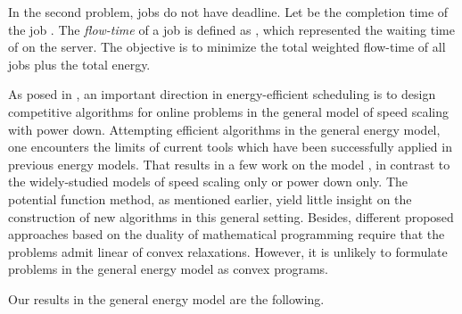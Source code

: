 \documentclass[11pt]{article}
\begin{document}
In the second problem, jobs do not have deadline. Let  
be the completion time of the job . 
The \emph{flow-time} of a job  is defined as , 
which represented the waiting time of  on the server.
The objective is to minimize the total weighted flow-time of all jobs plus the total 
energy. 

As posed in \cite{Albers10:Energy-efficient-algorithms}, an important direction in energy-efficient scheduling
is to design competitive algorithms for online problems
in the general model of speed scaling with power down. 
Attempting efficient algorithms in the general energy model, one encounters 
the limits of current tools which have been successfully applied 
in previous energy models. That results in a few work on the model
\cite{AlbersAntoniadis12:Race-to-idle:,BampisDurr12:Speed-scaling,HanLam10:Deadline-scheduling},
in contrast to the widely-studied models of speed scaling only or power down only. 
The potential function method, as mentioned earlier, yield little insight
on the construction of new algorithms in this general setting.     
Besides, different proposed approaches based on the duality of 
mathematical programming
\cite{AnandGarg12:Resource-augmentation,GuptaKrishnaswamy12:Online-Primal-Dual,DevanurHuang14:Primal-Dual} 
require that the problems admit linear of convex relaxations. However, it is unlikely to 
formulate problems in the general energy model as convex 
programs.  

Our results in the general energy model are the following.
\end{document}
